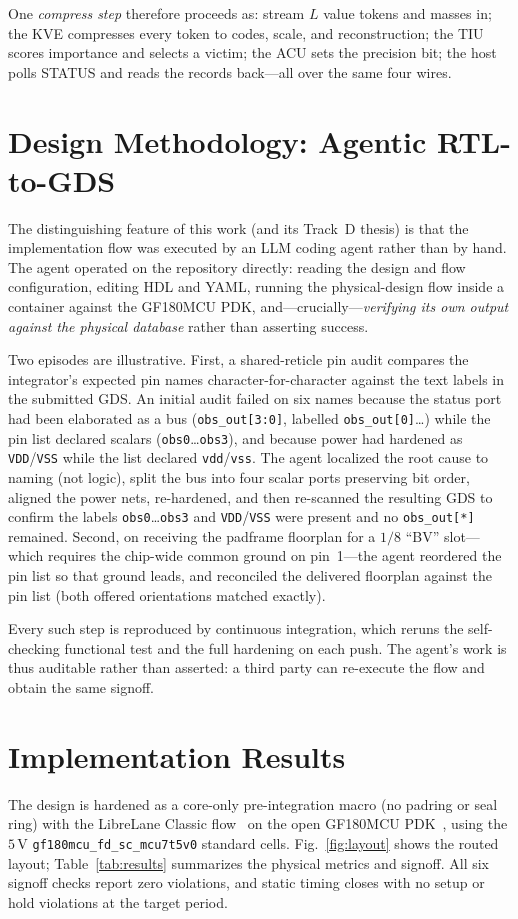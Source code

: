 \documentclass[conference]{IEEEtran}
\begin{document}
One \emph{compress step} therefore proceeds as: stream $L$ value tokens and
masses in; the KVE compresses every token to codes, scale, and reconstruction;
the TIU scores importance and selects a victim; the ACU sets the precision bit;
the host polls STATUS and reads the records back---all over the same four wires.

\section{Design Methodology: Agentic RTL-to-GDS}
\label{sec:method}
The distinguishing feature of this work (and its Track~D thesis) is that the
implementation flow was executed by an LLM coding agent rather than by hand. The
agent operated on the repository directly: reading the design and flow
configuration, editing HDL and YAML, running the physical-design flow inside a
container against the GF180MCU PDK, and---crucially---\emph{verifying its own
output against the physical database} rather than asserting success.

Two episodes are illustrative. First, a shared-reticle pin audit compares the
integrator's expected pin names character-for-character against the text labels
in the submitted GDS. An initial audit failed on six names because the status
port had been elaborated as a bus (\texttt{obs\_out[3:0]}, labelled
\texttt{obs\_out[0]}\ldots) while the pin list declared scalars
(\texttt{obs0}\ldots\texttt{obs3}), and because power had hardened as
\texttt{VDD}/\texttt{VSS} while the list declared \texttt{vdd}/\texttt{vss}. The
agent localized the root cause to naming (not logic), split the bus into four
scalar ports preserving bit order, aligned the power nets, re-hardened, and then
re-scanned the resulting GDS to confirm the labels
\texttt{obs0}\ldots\texttt{obs3} and \texttt{VDD}/\texttt{VSS} were present and no
\texttt{obs\_out[*]} remained. Second, on receiving the padframe floorplan for a
$1/8$ ``BV'' slot---which requires the chip-wide common ground on pin~1---the
agent reordered the pin list so that ground leads, and reconciled the delivered
floorplan against the pin list (both offered orientations matched exactly).

Every such step is reproduced by continuous integration, which reruns the
self-checking functional test and the full hardening on each push. The agent's
work is thus auditable rather than asserted: a third party can re-execute the
flow and obtain the same signoff.

\section{Implementation Results}
\label{sec:results}
The design is hardened as a core-only pre-integration macro (no padring or seal
ring) with the LibreLane Classic flow~\cite{openlane} on the open GF180MCU
PDK~\cite{gf180}, using the $5$\,V \texttt{gf180mcu\_fd\_sc\_mcu7t5v0} standard
cells. Fig.~\ref{fig:layout} shows the routed layout; Table~\ref{tab:results}
summarizes the physical metrics and signoff. All six signoff checks report zero
violations, and static timing closes with no setup or hold violations at the
target period.
\end{document}
